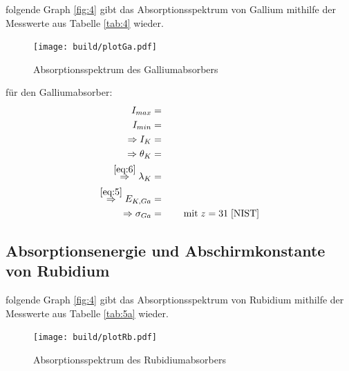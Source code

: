     \justifying folgende Graph \ref{fig:4} gibt das Absorptionsspektrum von Gallium mithilfe der Messwerte aus Tabelle \ref{tab:4} 
    wieder.

    \begin{figure}[H]
        \centering
        \texttt{[image: build/plotGa.pdf]}
        \caption{Absorptionsspektrum des Galliumabsorbers}
        \label{fig:5}
    \end{figure}

    \justifying für den Galliumabsorber:
    \begin{subequations}\label{eq:22}
    \begin{align}
        I_{max} &= \text{} \label{eq:22a}\\
        I_{min} &= \text{} \label{eq:22b}\\
        \Rightarrow I_K &= \text{} \label{eq:22c}\\
        \Rightarrow \theta_K &= \text{} \label{eq:22d}\\
        \stackrel{\eqref{eq:6}}{\Rightarrow} \lambda_K &= \text{} \label{eq:22e}\\
        \stackrel{\eqref{eq:5}}{\Rightarrow} E_{K,Ga} &= \text{} \label{eq:22f}\\
        \Rightarrow \sigma_{Ga} &= \text{} \qquad \text{mit}\; z=31\; \text{\cite{NIST}} \label{eq:22g}
    \end{align}
    \end{subequations}

\subsection{Absorptionsenergie und Abschirmkonstante von Rubidium}

    \justifying folgende Graph \ref{fig:4} gibt das Absorptionsspektrum von Rubidium mithilfe der Messwerte aus Tabelle \ref{tab:5a} 
    wieder.

    \begin{figure}[H]
        \centering
        \texttt{[image: build/plotRb.pdf]}
        \caption{Absorptionsspektrum des Rubidiumabsorbers}
        \label{fig:6}
    \end{figure}

